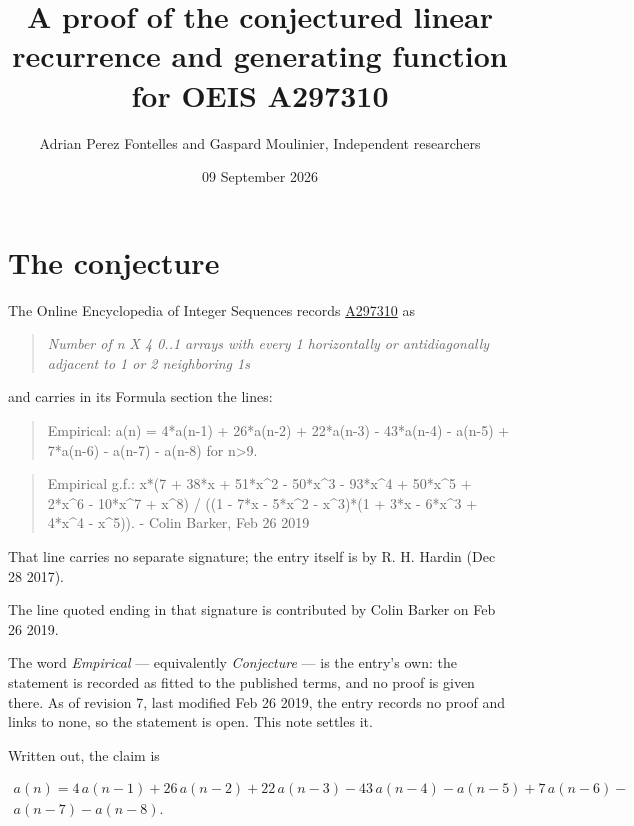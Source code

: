 \documentclass[11pt]{article}
\title{A proof of the conjectured linear recurrence and generating function for OEIS A297310}
\author{Adrian Perez Fontelles and Gaspard Moulinier, Independent researchers}
\date{09 September 2026}
\theoremstyle{definition}
\begin{document}
\maketitle
\section{The conjecture}

The Online Encyclopedia of Integer Sequences records \href{https://oeis.org/A297310}{A297310} as

\begin{quote}\itshape Number of n X 4 0..1 arrays with every 1 horizontally or antidiagonally adjacent to 1 or 2 neighboring 1s\end{quote}

and carries in its Formula section the lines:

\begin{quote}\ttfamily Empirical: a(n) = 4*a(n-1) + 26*a(n-2) + 22*a(n-3) - 43*a(n-4) - a(n-5) + 7*a(n-6) - a(n-7) - a(n-8) for n>9.\end{quote}

\begin{quote}\ttfamily Empirical g.f.: x*(7 + 38*x + 51*x\textasciicircum{}2 - 50*x\textasciicircum{}3 - 93*x\textasciicircum{}4 + 50*x\textasciicircum{}5 + 2*x\textasciicircum{}6 - 10*x\textasciicircum{}7 + x\textasciicircum{}8) / ((1 - 7*x - 5*x\textasciicircum{}2 - x\textasciicircum{}3)*(1 + 3*x - 6*x\textasciicircum{}3 + 4*x\textasciicircum{}4 - x\textasciicircum{}5)). - Colin Barker, Feb 26 2019\end{quote}

That line carries no separate signature; the entry itself is by R. H. Hardin (Dec 28 2017).

The line quoted ending in that signature is contributed by Colin Barker on Feb 26 2019.

The word {\itshape Empirical} --- equivalently {\itshape Conjecture} --- is the entry's own: the statement is recorded as fitted to the published terms, and no proof is given there. As of revision 7, last modified Feb 26 2019, the entry records no proof and links to none, so the statement is open. This note settles it.

Written out, the claim is

\begin{multline*} a(n) = 4\,a(n-1) + 26\,a(n-2) + 22\,a(n-3) - 43\,a(n-4) - a(n-5) + 7\,a(n-6) - \\ a(n-7) - a(n-8). \end{multline*}
\end{document}
